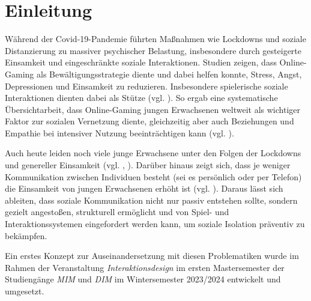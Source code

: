 \chapter{Einleitung}



Während der Covid-19-Pandemie führten Maßnahmen wie Lockdowns und soziale Distanzierung zu massiver psychischer Belastung, insbesondere durch gesteigerte Einsamkeit und eingeschränkte soziale Interaktionen. Studien zeigen, dass Online-Gaming als Bewältigungsstrategie diente und dabei helfen konnte, Stress, Angst, Depressionen und Einsamkeit zu reduzieren. Insbesondere spielerische soziale Interaktionen dienten dabei als Stütze (vgl. \cite{lewinson_gaming_2023}). So ergab eine systematische Übersichtarbeit, dass Online-Gaming jungen Erwachsenen weltweit als wichtiger Faktor zur sozialen Vernetzung diente, gleichzeitig aber auch Beziehungen und Empathie bei intensiver Nutzung beeinträchtigen kann (vgl. \cite{park_global_2025}). 

Auch heute leiden noch viele junge Erwachsene unter den Folgen der Lockdowns und genereller Einsamkeit (vgl. \cite{peer_junge_2024}, \cite{noauthor_einsamkeitsreport_2024}). Darüber hinaus zeigt sich, dass je weniger Kommunikation zwischen Individuen besteht (sei es persönlich oder per Telefon) die Einsamkeit von jungen Erwachsenen erhöht ist (vgl. \cite[S. 3]{sakurai_who_2021}). Daraus lässt sich ableiten, dass soziale Kommunikation nicht nur passiv entstehen sollte, sondern gezielt angestoßen, strukturell ermöglicht und von Spiel- und Interaktionssystemen eingefordert werden kann, um soziale Isolation präventiv zu bekämpfen. 

Ein erstes Konzept zur Auseinandersetzung mit diesen Problematiken wurde im Rahmen der Veranstaltung \emph{Interaktionsdesign} im ersten Mastersemester der Studiengänge\emph{ \ac{MIM}} und \emph{\ac{DIM}} im Wintersemester 2023/2024 entwickelt und umgesetzt.

